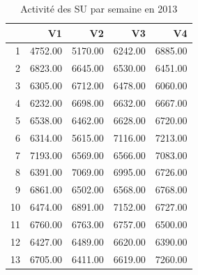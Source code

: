 \documentclass[12pt,english,french,twoside]{book}\usepackage[]{graphicx}\usepackage[]{color}
\begin{document}
\begin{table}[ht]
\centering
\begin{tabular}{rrrrr}
  \hline
 & V1 & V2 & V3 & V4 \\ 
  \hline
1 & 4752.00 & 5170.00 & 6242.00 & 6885.00 \\ 
  2 & 6823.00 & 6645.00 & 6530.00 & 6451.00 \\ 
  3 & 6305.00 & 6712.00 & 6478.00 & 6060.00 \\ 
  4 & 6232.00 & 6698.00 & 6632.00 & 6667.00 \\ 
  5 & 6538.00 & 6462.00 & 6628.00 & 6720.00 \\ 
  6 & 6314.00 & 5615.00 & 7116.00 & 7213.00 \\ 
  7 & 7193.00 & 6569.00 & 6566.00 & 7083.00 \\ 
  8 & 6391.00 & 7069.00 & 6995.00 & 6726.00 \\ 
  9 & 6861.00 & 6502.00 & 6568.00 & 6768.00 \\ 
  10 & 6474.00 & 6891.00 & 7152.00 & 6727.00 \\ 
  11 & 6760.00 & 6763.00 & 6757.00 & 6500.00 \\ 
  12 & 6427.00 & 6489.00 & 6620.00 & 6390.00 \\ 
  13 & 6705.00 & 6411.00 & 6619.00 & 7260.00 \\ 
   \hline
\end{tabular}
\caption[Activité par semaine]{Activité des SU par semaine en 2013} 
\end{table}
\end{document}
